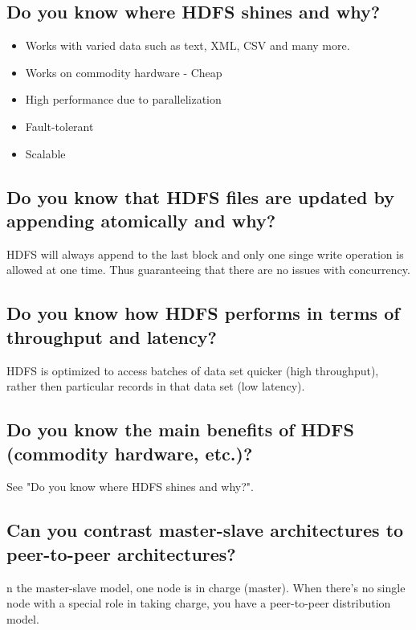 \documentclass{article}
\begin{document}
\subsection{Do you know where HDFS shines and why?}

\begin{itemize}
    \item Works with varied data such as text, XML, CSV and many more.
    \item Works on commodity hardware - Cheap
    \item High performance due to parallelization
    \item Fault-tolerant
    \item Scalable
\end{itemize}

\subsection{Do you know that HDFS files are updated by appending atomically and why?}

HDFS will always append to the last block and only one singe write operation is allowed at one time. Thus guaranteeing that there are no issues with concurrency.

\subsection{Do you know how HDFS performs in terms of throughput and latency?}

{\color{red} HDFS is optimized to access batches of data set quicker (high throughput), rather then particular records in that data set (low latency).}

\subsection{Do you know the main benefits of HDFS (commodity hardware, etc.)?}

See "Do you know where HDFS shines and why?".

\subsection{Can you contrast master-slave architectures to peer-to-peer architectures?}

n the master-slave model, one node is in charge (master). When there’s no single node with a special role in taking charge, you have a peer-to-peer distribution model.
\end{document}
